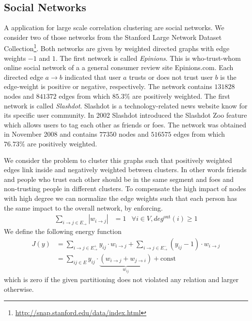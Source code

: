 \documentclass[10pt,twocolumn,letterpaper]{article}
\begin{document}
\subsection{Social Networks}
A application for large scale correlation clustering are social networks.
We consider two of those networks from the Stanford Large Network Dataset Collection\footnote{\url{http://snap.stanford.edu/data/index.html}}.
Both networks are given by weighted directed graphs with edge weights $-1$ and $1$. 
%
The first network is called \emph{Epinions}. 
This is who-trust-whom online social network of a a general consumer review site Epinions.com. 
Each directed edge $a\to b$ indicated that user $a$ trusts  or does not trust user $b$ is the edge-weight is positive or negative, respectively.
The network contains $131828$ nodes and $841372$ edges from which $85.3\%$ are positively weighted.
%
The first network is called \emph{Slashdot}. 
Slashdot is a technology-related news website know for its specific user community. 
In 2002 Slashdot introduced the Slashdot Zoo feature which allows users to tag each other as friends or foes. 
The network was obtained in November 2008 and contains $77350$ nodes and $516575$ edges from which $76.73\%$ are positively weighted.

We consider the problem to cluster this graphs such that positively weighted edges link inside and negatively weighted between clusters.
In other words friends and people who trust each other should be in the same segment and foes and non-trusting people in different clusters.
% 
To compensate the high impact of nodes with high degree we can normalize the edge weights such that each person has the same impact to the overall network, by enforcing.
\begin{align}
  \sum_{i\to j \in E_{\to}} |w_{i\to j}| &= 1&\forall i\in V, deg^{\textrm{out}}(i)\geq 1 
\end{align}
We define the following energy function
\begin{align}
 J(y) &= \sum_{i\to j \in E^+_{\to}} y_{ij}\cdot w_{i \to j} +  \sum_{i\to j \in E^-_{\to}} (y_{ij}-1)\cdot w_{i \to j} \nonumber\\
      &= \sum_{ij \in E} y_{ij}\cdot \underbrace{(w_{i \to j}+w_{j \to i})}_{w_{ij}} + \textrm{const}
\end{align}
which is zero if the given partitioning does not violated any relation and larger otherwise.
\end{document}
